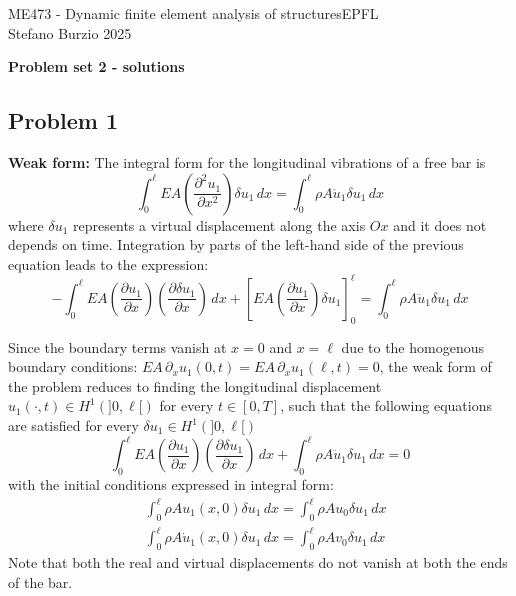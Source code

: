 \documentclass[12pt]{article}
\begin{document}
\noindent ME473 - Dynamic finite element analysis of structures\hfill EPFL\\
Stefano Burzio \hfill 2025\\
\vspace{0.3cm}

\hspace*{\fill}\textbf{\Large Problem set 2 - solutions}\hspace*{\fill}

\hrulefill

\subsection*{Problem 1}
\textbf{Weak form:} The integral form for the longitudinal vibrations of a free bar is
$$\int_0^{\ell} E A\left(\frac{\partial^2 u_1}{\partial x^2}\right) \delta u_1\, dx=\int_0^{\ell} \rho A \ddot{u}_1 \delta u_1\, dx$$
where $\delta u_1$ represents a virtual displacement along the axis $Ox$ and it does not depends on time. Integration by parts of the left-hand side of the previous equation leads to the expression:
\begin{equation*}
    -\int_0^{\ell} E A\left(\frac{\partial u_1}{\partial x}\right)\left(\frac{\partial \delta u_1}{\partial x}\right)\, dx+\left[E A\left(\frac{\partial u_1}{\partial x}\right) \delta u_1\right]_0 ^{\ell}=
    \int_0^{\ell} \rho A \ddot{u}_1 \delta u_1\, dx
\end{equation*}

Since the boundary terms vanish at $x=0$ and $x=\ell$ due to the homogenous boundary conditions: $EA \, \partial_{x} u_1(0, t)=EA \, \partial_{x} u_1(\ell, t) = 0$, the weak form of the problem reduces to finding the longitudinal displacement $u_1(\cdot,t) \in H^1(]0, \ell[)$ for every $t \in[0, T]$, such that the following equations are satisfied for every $\delta u_1 \in H^1(]0, \ell[)$
        \begin{equation}
            \label{wf}
            \int_0^{\ell} E A\left(\frac{\partial u_1}{\partial x}\right)\left(\frac{\partial \delta u_1}{\partial x}\right)\, dx+
            \int_0^{\ell} \rho A \ddot{u}_1 \delta u_1\, dx=0
        \end{equation}
        with the initial conditions expressed in integral form:
        \begin{equation}
            \label{ic}
            \begin{aligned}
                 & \int_0^{\ell} \rho A u_1\left(x, 0\right) \delta u_1\, dx=
                \int_0^{\ell} \rho A u_{0} \delta u_1 \, d x                          \\
                 & \int_0^{\ell} \rho A \dot{u}_1\left(x, 0\right) \delta u_1 \, d x=
                \int_0^{\ell} \rho A {v}_{0} \delta u_1 \, d x
            \end{aligned}
        \end{equation}
        Note that both the real and virtual displacements do not vanish at both the ends of the bar.
        \vspace{0.3cm}
\end{document}
